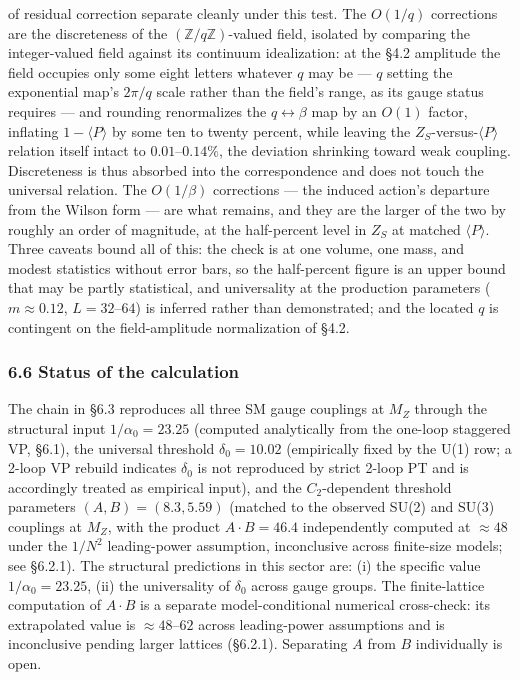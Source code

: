 \documentclass[
]{article}
\begin{document}
of residual correction separate cleanly under this test. The \(O(1/q)\)
corrections are the discreteness of the
\((\mathbb{Z}/q\mathbb{Z})\)-valued field, isolated by comparing the
integer-valued field against its continuum idealization: at the §4.2
amplitude the field occupies only some eight letters whatever \(q\) may
be --- \(q\) setting the exponential map's \(2\pi/q\) scale rather than
the field's range, as its gauge status requires --- and rounding
renormalizes the \(q \leftrightarrow \beta\) map by an \(O(1)\) factor,
inflating \(1 - \langle P\rangle\) by some ten to twenty percent, while
leaving the \(Z_S\)-versus-\(\langle P\rangle\) relation itself intact
to \(0.01\)--\(0.14\%\), the deviation shrinking toward weak coupling.
Discreteness is thus absorbed into the correspondence and does not touch
the universal relation. The \(O(1/\beta)\) corrections --- the induced
action's departure from the Wilson form --- are what remains, and they
are the larger of the two by roughly an order of magnitude, at the
half-percent level in \(Z_S\) at matched \(\langle P\rangle\). Three
caveats bound all of this: the check is at one volume, one mass, and
modest statistics without error bars, so the half-percent figure is an
upper bound that may be partly statistical, and universality at the
production parameters (\(m \approx 0.12\), \(L = 32\)--\(64\)) is
inferred rather than demonstrated; and the located \(q\) is contingent
on the field-amplitude normalization of §4.2.

\hypertarget{status-of-the-calculation}{%
\subsubsection{6.6 Status of the
calculation}\label{status-of-the-calculation}}

The chain in §6.3 reproduces all three SM gauge couplings at \(M_Z\)
through the structural input \(1/\alpha_0 = 23.25\) (computed
analytically from the one-loop staggered VP, §6.1), the universal
threshold \(\delta_0 = 10.02\) (empirically fixed by the U(1) row; a
2-loop VP rebuild indicates \(\delta_0\) is not reproduced by strict
2-loop PT and is accordingly treated as empirical input), and the
\(C_2\)-dependent threshold parameters \((A, B) = (8.3, 5.59)\) (matched
to the observed SU(2) and SU(3) couplings at \(M_Z\), with the product
\(A \cdot B = 46.4\) independently computed at \(\approx 48\) under the
\(1/N^2\) leading-power assumption, inconclusive across finite-size
models; see §6.2.1). The structural predictions in this sector are: (i)
the specific value \(1/\alpha_0 = 23.25\), (ii) the universality of
\(\delta_0\) across gauge groups. The finite-lattice computation of
\(A \cdot B\) is a separate model-conditional numerical cross-check: its
extrapolated value is \(\approx 48\)--\(62\) across leading-power
assumptions and is inconclusive pending larger lattices (§6.2.1).
Separating \(A\) from \(B\) individually is open.
\end{document}
